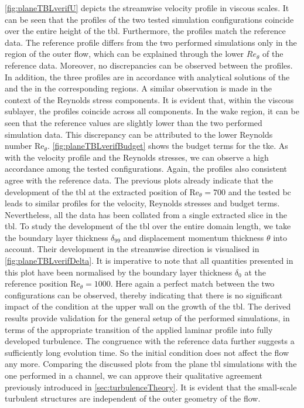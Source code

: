 \autoref{fig:planeTBLverifU} depicts the streamwise velocity profile in viscous scales.
It can be seen that the profiles of the two tested simulation configurations coincide over the entire height of the \acrshort{tbl}.
Furthermore, the profiles match the reference data.
The reference profile differs from the two performed simulations only in the region of the outer flow, which can be explained through the lower $Re_{\theta}$ of the reference data.
Moreover, no discrepancies can be observed between the profiles.
In addition, the three profiles are in accordance with analytical solutions of the  and the  in the corresponding regions.
A similar observation is made in the context of the Reynolds stress components.
It is evident that, within the viscous sublayer, the profiles coincide across all components.
In the wake region, it can be seen that the reference values are slightly lower than the two performed simulation data.
This discrepancy can be attributed to the lower Reynolds number $\mathrm{Re}_{\theta}$.
\autoref{fig:planeTBLverifBudget} shows the budget terms for the \acrshort{tke}.
As with the velocity profile and the Reynolds stresses, we can observe a high accordance among the tested configurations.
Again, the profiles also consistent agree with the reference data.
The previous plots already indicate that the development of the \acrshort{tbl} at the extracted position of $\mathrm{Re}_{\theta} = 700$ and the tested \acrshort{bc} leads to similar profiles for the velocity, Reynolds stresses and budget terms.
Nevertheless, all the data has been collated from a single extracted slice in the \acrshort{tbl}.
To study the development of the \acrshort{tbl} over the entire domain length, we take the boundary layer thickness $\delta_{99}$ and displacement momentum thickness $\theta$ into account.
Their development in the streamwise direction is visualised in \autoref{fig:planeTBLverifDelta}.
It is imperative to note that all quantities presented in this plot have been normalised by the boundary layer thickness $\delta_0$ at the reference position $\mathrm{Re}_{\theta} = 1000$.
Here again a perfect match between the two configurations can be observed, thereby indicating that there is no significant impact of the  condition at the upper wall on the growth of the \acrshort{tbl}.
The derived results provide validation for the general setup of the performed simulations, in terms of the appropriate transition of the applied laminar profile into fully developed turbulence.
The congruence with the reference data further suggests a sufficiently long evolution time.
So the initial condition does not affect the flow any more.
Comparing the discussed plots from the plane \acrshort{tbl} simulations with the one performed in a channel, we can approve their qualitative agreement previously introduced in \autoref{sec:turbulenceTheory}.
It is evident that the small-scale turbulent structures are independent of the outer geometry of the flow.

